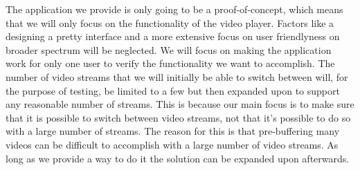 The application we provide is only going to be a proof-of-concept, which means that we will only focus on the functionality of the video player. Factors like a designing a pretty interface and a more extensive focus on user friendlyness on broader spectrum will be neglected. We will focus on making the application work for only one user to verify the functionality we want to accomplish. The number of video streams that we will initially be able to switch between will, for the purpose of testing, be limited to a few but then expanded upon to support any reasonable number of streams. This is because our main focus is to make sure that it is possible to switch between video streams, not that it's possible to do so with a large number of streams. The reason for this is that pre-buffering many videos can be difficult to accomplish with a large number of video streams. As long as we provide a way to do it the solution can be expanded upon afterwards.